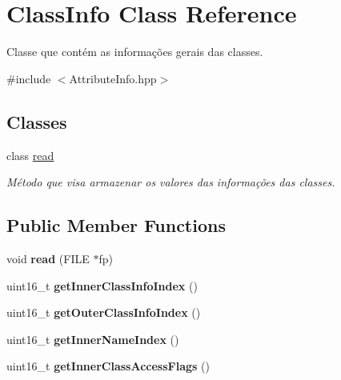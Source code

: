 \hypertarget{classClassInfo}{}\section{Class\+Info Class Reference}
\label{classClassInfo}


Classe que contém as informações gerais das classes.  




{\ttfamily \#include $<$Attribute\+Info.\+hpp$>$}

\subsection*{Classes}
\begin{DoxyCompactItemize}
\item 
class \hyperlink{classClassInfo_1_1read}{read}
\begin{DoxyCompactList}\small\item\em Método que visa armazenar os valores das informações das classes. \end{DoxyCompactList}\end{DoxyCompactItemize}
\subsection*{Public Member Functions}
\begin{DoxyCompactItemize}
\item 
void {\bfseries read} (F\+I\+LE $\ast$fp)\hypertarget{classClassInfo_ad2e55dfb641367a6f07cbc9a5fee931b}{}\label{classClassInfo_ad2e55dfb641367a6f07cbc9a5fee931b}

\item 
uint16\+\_\+t {\bfseries get\+Inner\+Class\+Info\+Index} ()\hypertarget{classClassInfo_a6355f698a36e546ab8a83aebdd02deaa}{}\label{classClassInfo_a6355f698a36e546ab8a83aebdd02deaa}

\item 
uint16\+\_\+t {\bfseries get\+Outer\+Class\+Info\+Index} ()\hypertarget{classClassInfo_a89d3d35fe30b9846ff6907be50e86b29}{}\label{classClassInfo_a89d3d35fe30b9846ff6907be50e86b29}

\item 
uint16\+\_\+t {\bfseries get\+Inner\+Name\+Index} ()\hypertarget{classClassInfo_a38075d61d6812ecf422de434aa11bb01}{}\label{classClassInfo_a38075d61d6812ecf422de434aa11bb01}

\item 
uint16\+\_\+t {\bfseries get\+Inner\+Class\+Access\+Flags} ()\hypertarget{classClassInfo_a3e09735f9005ba692b86fbde0417b17f}{}\label{classClassInfo_a3e09735f9005ba692b86fbde0417b17f}

\end{DoxyCompactItemize}


